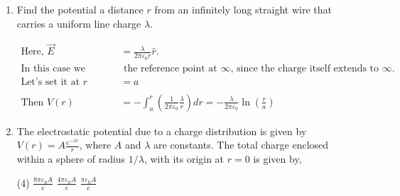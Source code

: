 \begin{enumerate}[label=\color{ocre}\textbf{\arabic*.}]
\begin{answer}
	\end{answer}
	\item  Find the potential a distance $r$ from an infinitely long straight wire that carries a uniform line charge $\lambda$.
	\begin{answer}
		\begin{align*}
		\text{Here, }\vec{E}&=\frac{\lambda}{2 \pi \varepsilon_{0} r} \hat{r} . \\\text{In this case we cannot set}&\text{ the reference point at $\infty$, since the charge itself extends to $\infty$. }
		\\\text{Let's set it at }r&=a\\
		\\\text{Then }V(r)&=-\int_{a}^{r}\left(\frac{1}{2 \pi \varepsilon_{0}} \frac{\lambda}{r}\right) d r=-\frac{\lambda}{2 \pi \varepsilon_{0}} \ln \left(\frac{r}{a}\right)
		\end{align*}
	\end{answer}
	\item The electrostatic potential due to a charge distribution is given by $V(r)=A \frac{e^{-\lambda r}}{r}$, where $A$ and $\lambda$ are constants. The total charge enclosed within a sphere of radius $1 / \lambda$, with its origin at $r=0$ is given by,
	\begin{tasks}(4)
		\task[\textbf{a.}]$\frac{8 \pi \varepsilon_{0} A}{e}$  
		\task[\textbf{b.}] $\frac{4 \pi \varepsilon_{0} A}{e}$
		\task[\textbf{c.}]$\frac{\pi \varepsilon_{0} A}{e}$ 
	\end{tasks}
	\begin{answer}
		

\end{answer}
\end{enumerate}
